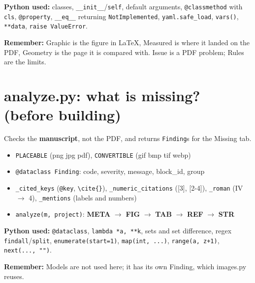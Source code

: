 \documentclass[10.5pt,a4paper]{article}
\newcommand{\cc}[1]{\texttt{#1}}
\newcommand{\remember}[1]{\par\smallskip\noindent\colorbox{soft}{\parbox{\dimexpr\linewidth-2\fboxsep}{\textbf{\color{slate}Remember:} #1}}\par\smallskip}
\begin{document}
\textbf{Python used:} classes, \cc{\_\_init\_\_}/\cc{self}, default arguments, \cc{@classmethod} with \cc{cls}, \cc{@property}, \cc{\_\_eq\_\_} returning \cc{NotImplemented}, \cc{yaml.safe\_load}, \cc{vars()}, \cc{**data}, \cc{raise ValueError}.
\remember{Graphic is the figure in LaTeX, Measured is where it landed on the PDF, Geometry is the page it is compared with. Issue is a PDF problem; Rules are the limits.}

\section{analyze.py: what is missing? (before building)}
Checks the \textbf{manuscript}, not the PDF, and returns \cc{Finding}s for the Missing tab.
\begin{itemize}
\item \cc{PLACEABLE} (png jpg pdf), \cc{CONVERTIBLE} (gif bmp tif webp)
\item \cc{@dataclass Finding}: code, severity, message, block\_id, group
\item \cc{\_cited\_keys} (\cc{@key}, \cc{\textbackslash cite\{\}}), \cc{\_numeric\_citations} ([3], [2-4]), \cc{\_roman} (IV \(\rightarrow\) 4), \cc{\_mentions} (labels and numbers)
\item \cc{analyze(m, project)}: \textbf{META} \(\rightarrow\) \textbf{FIG} \(\rightarrow\) \textbf{TAB} \(\rightarrow\) \textbf{REF} \(\rightarrow\) \textbf{STR}
\end{itemize}
\textbf{Python used:} \cc{@dataclass}, \cc{lambda *a, **k}, sets and set difference, regex \cc{findall}/\cc{split}, \cc{enumerate(start=1)}, \cc{map(int, ...)}, \cc{range(a, z+1)}, \cc{next(..., "")}.
\remember{Models are not used here; it has its own Finding, which images.py reuses.}

\end{document}
